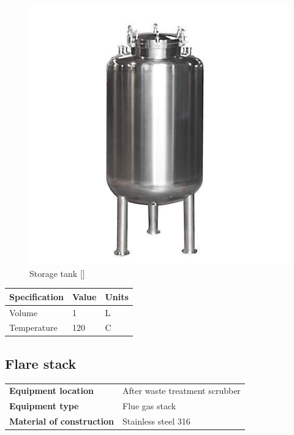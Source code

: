 \begin{figure}[H]
    \centering
    \includegraphics[width=\linewidth]{chapters/Z-support/figures/stainless-steel-storage-tank-500x500.jpg}
    \caption{Storage tank []}
\end{figure}

\begin{table}[H]
\centering
\begin{tabular}{@{}l|l|l@{}}
\toprule
\textbf{Specification}                    & \textbf{Value} & \textbf{Units} \\ \midrule
Volume                              & 1            & L            \\ \midrule
Temperature                     & 120     & C           \\ \bottomrule
\end{tabular}
\end{table}




\newpage
\subsection{Flare stack}

\begin{table}[H]
    \centering
    \begin{tabular}{@{}l|l@{}}
    \toprule
      \textbf{Equipment location}  & After waste treatment scrubber\\
       \textbf{Equipment type}  & Flue gas stack \\
       \textbf{Material of construction} & Stainless steel 316 \\
       \bottomrule
    \end{tabular}
\end{table}


